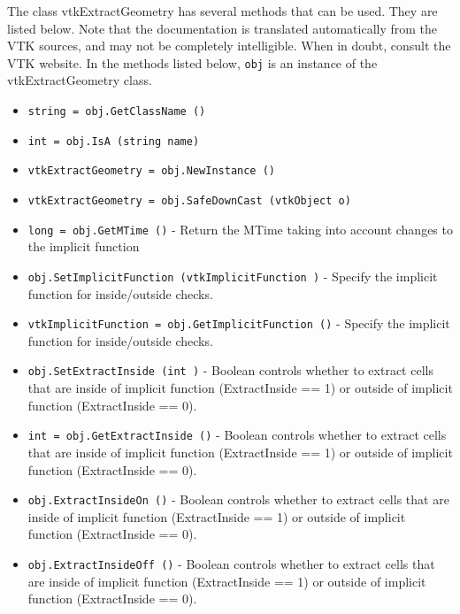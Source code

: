 The class vtkExtractGeometry has several methods that can be used.
  They are listed below.
Note that the documentation is translated automatically from the VTK sources,
and may not be completely intelligible.  When in doubt, consult the VTK website.
In the methods listed below, \verb|obj| is an instance of the vtkExtractGeometry class.
\begin{itemize}
\item  \verb|string = obj.GetClassName ()|

\item  \verb|int = obj.IsA (string name)|

\item  \verb|vtkExtractGeometry = obj.NewInstance ()|

\item  \verb|vtkExtractGeometry = obj.SafeDownCast (vtkObject o)|

\item  \verb|long = obj.GetMTime ()| -  Return the MTime taking into account changes to the implicit function

\item  \verb|obj.SetImplicitFunction (vtkImplicitFunction )| -  Specify the implicit function for inside/outside checks.

\item  \verb|vtkImplicitFunction = obj.GetImplicitFunction ()| -  Specify the implicit function for inside/outside checks.

\item  \verb|obj.SetExtractInside (int )| -  Boolean controls whether to extract cells that are inside of implicit 
 function (ExtractInside == 1) or outside of implicit function 
 (ExtractInside == 0).

\item  \verb|int = obj.GetExtractInside ()| -  Boolean controls whether to extract cells that are inside of implicit 
 function (ExtractInside == 1) or outside of implicit function 
 (ExtractInside == 0).

\item  \verb|obj.ExtractInsideOn ()| -  Boolean controls whether to extract cells that are inside of implicit 
 function (ExtractInside == 1) or outside of implicit function 
 (ExtractInside == 0).

\item  \verb|obj.ExtractInsideOff ()| -  Boolean controls whether to extract cells that are inside of implicit 
 function (ExtractInside == 1) or outside of implicit function 
 (ExtractInside == 0).


\end{itemize}
